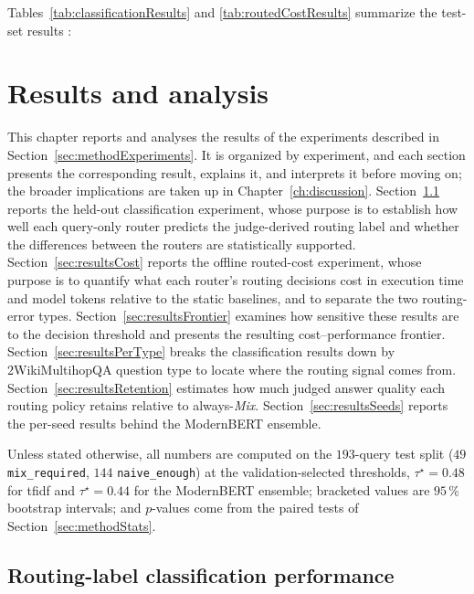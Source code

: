 \documentclass[english, bibtex]{kththesis}               %
\numberwithin{listing}{chapter}
\providecommand{\DIFaddtex}[1]{{\protect\color{blue} \sf #1}} %
\providecommand{\DIFdeltex}[1]{{\protect\color{red} \scriptsize #1}} %
\providecommand{\DIFaddbegin}{} %
\providecommand{\DIFdelbegin}{} %
\providecommand{\DIFdelend}{} %
\providecommand{\DIFadd}[1]{\texorpdfstring{\DIFaddtex{#1}}{#1}} %
\providecommand{\DIFdel}[1]{\texorpdfstring{\DIFdeltex{#1}}{}} %
\begin{document}
\DIFdelbegin \DIFdel{Tables~\ref{tab:classificationResults} and \ref{tab:routedCostResults} summarize the test-set results : }\DIFdelend \DIFaddbegin \cleardoublepage
\chapter{Results and analysis}
\label{ch:results}
\label{ch:implementation}

\DIFadd{This chapter reports and analyses the results of the experiments described in Section~\ref{sec:methodExperiments}. It is organized by experiment, and each section presents the corresponding result, explains it, and interprets it before moving on; the broader implications are taken up in Chapter~\ref{ch:discussion}. Section~\ref{sec:resultsClassification} reports the held-out classification experiment, whose purpose is to establish how well each query-only router predicts the judge-derived routing label and whether the differences between the routers are statistically supported. Section~\ref{sec:resultsCost} reports the offline routed-cost experiment, whose purpose is to quantify what each router's routing decisions cost in execution time and model tokens relative to the static baselines, and to separate the two routing-error types. Section~\ref{sec:resultsFrontier} examines how sensitive these results are to the decision threshold and presents the resulting cost--performance frontier. Section~\ref{sec:resultsPerType} breaks the classification results down by 2WikiMultihopQA question type to locate where the routing signal comes from. Section~\ref{sec:resultsRetention} estimates how much judged answer quality each routing policy retains relative to always-\emph{Mix}. Section~\ref{sec:resultsSeeds} reports the per-seed results behind the ModernBERT ensemble.
}

\DIFadd{Unless stated otherwise, all numbers are computed on the $193$-query test split ($49$ \texttt{mix\_required}, $144$ \texttt{naive\_enough}) at the validation-selected thresholds, $\tau^\star = 0.48$ for \gls{tfidf} and $\tau^\star = 0.44$ for the ModernBERT ensemble; bracketed values are $95\,\%$ bootstrap intervals; and $p$-values come from the paired tests of Section~\ref{sec:methodStats}.
}

\section{Routing-label classification performance}
\label{sec:resultsClassification}
\label{sec:implResults}
\end{document}
